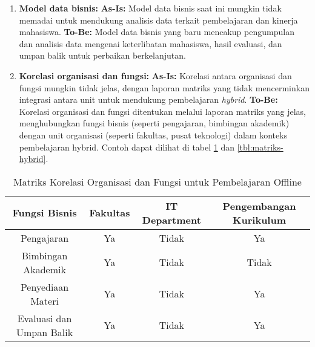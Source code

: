 \begin{enumerate}
	\item \textbf{Model data bisnis:}  
	\textbf{As-Is:} Model data bisnis saat ini mungkin tidak memadai untuk mendukung analisis data terkait pembelajaran dan kinerja mahasiswa.  
	\textbf{To-Be:} Model data bisnis yang baru mencakup pengumpulan dan analisis data mengenai keterlibatan mahasiswa, hasil evaluasi, dan umpan balik untuk perbaikan berkelanjutan.
	
	\item \textbf{Korelasi organisasi dan fungsi:}  
	\textbf{As-Is:} Korelasi antara organisasi dan fungsi mungkin tidak jelas, dengan laporan matriks yang tidak mencerminkan integrasi antara unit untuk mendukung pembelajaran \textit{hybrid}.  
	\textbf{To-Be:} Korelasi organisasi dan fungsi ditentukan melalui laporan matriks yang jelas, menghubungkan fungsi bisnis (seperti pengajaran, bimbingan akademik) dengan unit organisasi (seperti fakultas, pusat teknologi) dalam konteks pembelajaran hybrid. Contoh dapat dilihat di tabel \ref{tbl:matriks-offline} dan \ref{tbl:matriks-hybrid}.
\end{enumerate}


\begin{table}[h]
	\centering
	\caption{Matriks Korelasi Organisasi dan Fungsi untuk Pembelajaran Offline}
	\begin{tabular}{|c|c|c|c|}
		\hline
		\textbf{Fungsi Bisnis} & \textbf{Fakultas} & \textbf{IT Department} & \textbf{Pengembangan Kurikulum} \\ \hline
		Pengajaran            & Ya                  & Tidak                    & Ya                         \\ \hline
		Bimbingan Akademik    & Ya                  & Tidak                    & Tidak                      \\ \hline
		Penyediaan Materi     & Ya                  & Tidak                    & Ya                         \\ \hline
		Evaluasi dan Umpan Balik & Ya              & Tidak                    & Ya                         \\ \hline
	\end{tabular}
\label{tbl:matriks-offline}
\end{table}

